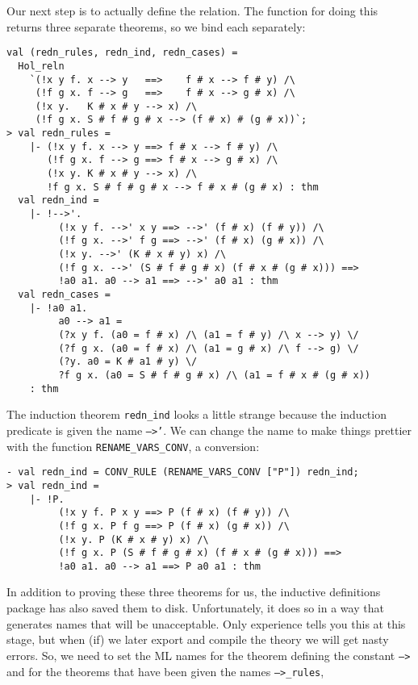 Our next step is to actually define the relation.  The function for
doing this returns three separate theorems, so we bind each
separately:
\begin{session}
\begin{verbatim}
val (redn_rules, redn_ind, redn_cases) =
  Hol_reln
    `(!x y f. x --> y   ==>    f # x --> f # y) /\
     (!f g x. f --> g   ==>    f # x --> g # x) /\
     (!x y.   K # x # y --> x) /\
     (!f g x. S # f # g # x --> (f # x) # (g # x))`;
> val redn_rules =
    |- (!x y f. x --> y ==> f # x --> f # y) /\
       (!f g x. f --> g ==> f # x --> g # x) /\
       (!x y. K # x # y --> x) /\
       !f g x. S # f # g # x --> f # x # (g # x) : thm
  val redn_ind =
    |- !-->'.
         (!x y f. -->' x y ==> -->' (f # x) (f # y)) /\
         (!f g x. -->' f g ==> -->' (f # x) (g # x)) /\
         (!x y. -->' (K # x # y) x) /\
         (!f g x. -->' (S # f # g # x) (f # x # (g # x))) ==>
         !a0 a1. a0 --> a1 ==> -->' a0 a1 : thm
  val redn_cases =
    |- !a0 a1.
         a0 --> a1 =
         (?x y f. (a0 = f # x) /\ (a1 = f # y) /\ x --> y) \/
         (?f g x. (a0 = f # x) /\ (a1 = g # x) /\ f --> g) \/
         (?y. a0 = K # a1 # y) \/
         ?f g x. (a0 = S # f # g # x) /\ (a1 = f # x # (g # x))
    : thm
\end{verbatim}
\end{session}
The induction theorem \texttt{redn\_ind} looks a little strange
because the induction predicate is given the name \texttt{-->'}.  We
can change the name to make things prettier with the function
\texttt{RENAME\_VARS\_CONV}, a conversion:
\begin{session}
\begin{verbatim}
- val redn_ind = CONV_RULE (RENAME_VARS_CONV ["P"]) redn_ind;
> val redn_ind =
    |- !P.
         (!x y f. P x y ==> P (f # x) (f # y)) /\
         (!f g x. P f g ==> P (f # x) (g # x)) /\
         (!x y. P (K # x # y) x) /\
         (!f g x. P (S # f # g # x) (f # x # (g # x))) ==>
         !a0 a1. a0 --> a1 ==> P a0 a1 : thm
\end{verbatim}
\end{session}
In addition to proving these three theorems for us, the inductive
definitions package has also saved them to disk.  Unfortunately, it
does so in a way that generates names that will be unacceptable.  Only
experience tells you this at this stage, but when (if) we later export
and compile the theory we will get nasty errors.  So, we need to set
the ML names for the theorem defining the constant \texttt{-->} and
for the theorems that have been given the names \texttt{-->\_rules},
